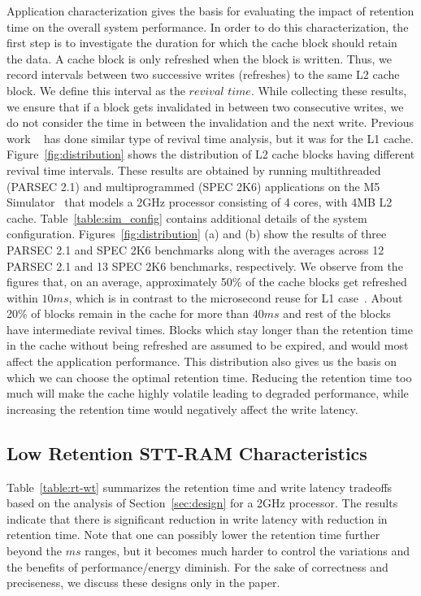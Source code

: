 Application characterization gives the basis for evaluating the impact of retention time on the
overall system performance. In order to do this characterization, the first step is to investigate
the duration for which the cache block should retain the data.  A cache block is only refreshed when
the block is written. Thus, we record intervals between two successive writes (refreshes) to the same
L2 cache block. We define this interval as the $revival$ $time$. While collecting these results, we
ensure that if a block gets invalidated in between two consecutive writes, we do not consider the
time in between the invalidation and the next write. Previous work ~\cite{3t1d-cache} has done
similar type of revival time analysis, but it was for the L1 cache. Figure~\ref{fig:distribution}
shows the distribution of L2 cache blocks having different revival time intervals. These results are
obtained by running multithreaded (PARSEC 2.1) and multiprogrammed (SPEC 2K6)
applications on the M5 Simulator~\cite{M5} that models a 2GHz processor consisting of 4 cores, with
4MB L2 cache. Table~\ref{table:sim_config} contains additional details of the system configuration.
Figures~\ref{fig:distribution} (a) and (b) show the results of three PARSEC 2.1
and SPEC 2K6 benchmarks along
with the averages across 12 PARSEC 2.1  and 13 SPEC 2K6 benchmarks, respectively. We observe from the figures
that, on an average, approximately 50\% of the cache blocks get refreshed within $10ms$, which is
in contrast to the microsecond reuse for L1 case~\cite{3t1d-cache}. About 20\% of blocks remain in
the cache for more than $40ms$ and rest of the blocks have intermediate revival times. Blocks
which stay longer than the retention time in the cache without being refreshed are assumed to be
expired, and would most affect the application performance. This distribution also gives us the
basis on which we can choose the optimal retention time. Reducing the retention time too much will
make the cache highly volatile leading to degraded performance, while increasing the retention time
would negatively affect the write latency.



\subsection{Low Retention STT-RAM Characteristics}
Table~\ref{table:rt-wt} summarizes the retention time and write latency tradeoffs based on the analysis of Section~\ref{sec:design}
for a 2GHz processor.
The results indicate that there is significant reduction in write latency with reduction in retention time.
Note that one can possibly lower the retention time further beyond the $ms$ ranges, but it becomes much harder to control the variations and the benefits of performance/energy diminish. For the sake of correctness and preciseness, we discuss these designs only in the paper.

